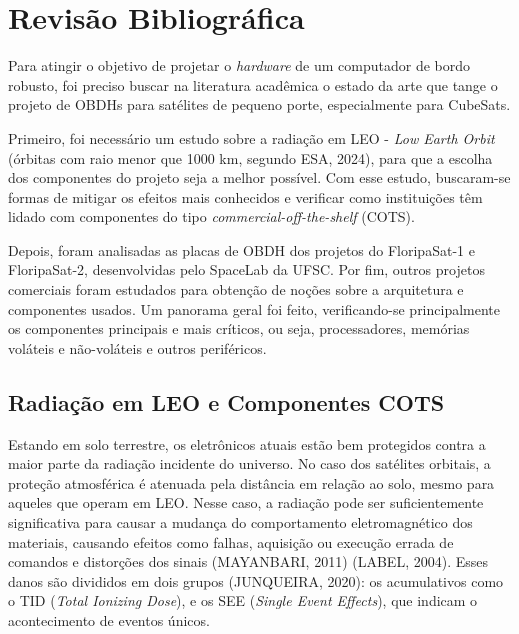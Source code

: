\chapter{Revisão Bibliográfica}

Para atingir o objetivo de projetar o \textit{hardware} de um computador de bordo robusto, foi preciso buscar na literatura acadêmica o estado da arte que tange o projeto de OBDHs para satélites de pequeno porte, especialmente para CubeSats.
 
Primeiro, foi necessário um estudo sobre a radiação em LEO - \textit{Low Earth Orbit} (órbitas com raio menor que 1000 km, segundo ESA, 2024), para que a escolha dos componentes do projeto seja a melhor possível. Com esse estudo, buscaram-se formas de mitigar os efeitos mais conhecidos e verificar como instituições têm lidado com componentes do tipo \textit{commercial-off-the-shelf} (COTS).%

Depois, foram analisadas as placas de OBDH dos projetos do FloripaSat-1 e FloripaSat-2, desenvolvidas pelo SpaceLab da UFSC. Por fim, outros projetos comerciais foram estudados para obtenção de noções sobre a arquitetura e componentes usados. Um panorama geral foi feito, verificando-se principalmente os componentes principais e mais críticos, ou seja, processadores, memórias voláteis e não-voláteis e outros periféricos.

\section{Radiação em LEO e Componentes COTS}

Estando em solo terrestre, os eletrônicos atuais estão bem protegidos contra a maior parte da radiação incidente do universo. No caso dos satélites orbitais, a proteção atmosférica é atenuada pela distância em relação ao solo, mesmo para aqueles que operam em LEO. Nesse caso, a radiação pode ser suficientemente significativa para causar a mudança do comportamento eletromagnético dos materiais, causando efeitos como falhas, aquisição ou execução errada de comandos e distorções dos sinais (MAYANBARI, 2011) (LABEL, 2004).  Esses danos são divididos em dois grupos (JUNQUEIRA, 2020): os acumulativos como o TID (\textit{Total Ionizing Dose}), e os SEE (\textit{Single Event Effects}), que indicam o acontecimento de eventos únicos. 

